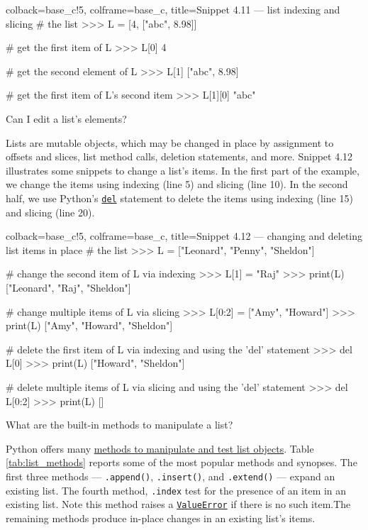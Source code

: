 \documentclass[a4paper,11pt]{book}
\newcommand{\question}[1]{%
    \begin{tcolorbox}[colback=comp_c!10,colframe=comp_c,sidebyside align=top,width=\linewidth,before skip=1ex]
        #1
    \end{tcolorbox}
    \switchcolumn%
}
\newcommand{\note}[1]{%
    \begin{tcolorbox}[colback=white!0,colframe=white!10,width=\linewidth,before skip=1ex]
        #1
    \end{tcolorbox}
}
\begin{document}
\begin{pythoncode}[linenos=true,]{colback=base_c!5, colframe=base_c, title=\sffamily Snippet 4.11 --- list indexing and slicing}
# the list
>>> L = [4, ["abc", 8.98]]

# get the first item of L
>>> L[0]
4

 # get the second element of L
>>> L[1]
["abc", 8.98]

# get the first item of L's second item
>>> L[1][0]
"abc"

\end{pythoncode}

\begin{paracol}{2}
	\question{\raggedright Can I edit a list's elements?}
	\note{Lists are mutable objects, which may be changed in place by assignment to offsets and slices, list method calls, deletion statements, and more. Snippet 4.12 illustrates some snippets to change a list's items. In the first part of the example, we change the items using indexing (line 5) and slicing (line 10). In the second half, we use Python's \href{https://docs.python.org/3/reference/simple_stmts.html}{\texttt{del}} statement to delete the items using indexing (line 15) and slicing (line 20).}
\end{paracol}

\begin{pythoncode}[linenos=true,]{colback=base_c!5, colframe=base_c, title=\sffamily Snippet 4.12 --- changing and deleting list items in place}
# the list
>>> L = ["Leonard", "Penny", "Sheldon"]

# change the second item of L via indexing
>>> L[1] = "Raj"
>>> print(L)
["Leonard", "Raj", "Sheldon"]

# change multiple items of L via slicing
>>> L[0:2] = ["Amy", "Howard"]
>>> print(L)
["Amy", "Howard", "Sheldon"]

# delete the first item of L via indexing and using the 'del' statement
>>> del L[0]
>>> print(L)
["Howard", "Sheldon"]

# delete multiple items of L via slicing and using the 'del' statement
>>> del L[0:2]
>>> print(L)
[]

\end{pythoncode}

\begin{paracol}{2}
\question{\raggedright What are the built-in methods to manipulate a list?}
\note{Python offers many \href{https://docs.python.org/3/tutorial/datastructures.html}{methods to manipulate and test list objects}. Table \ref{tab:list_methods} reports some of the most popular methods and synopses. The first three methods --- \texttt{.append()}, \texttt{.insert()}, and \texttt{.extend()} --- expand an existing list. The fourth method, \texttt{.index} test for the presence of an item in an existing list. Note this method raises a \href{https://docs.python.org/3/library/exceptions.html\#ValueError}{\texttt{ValueError}} if there is no such item.The remaining methods produce in-place changes in an existing list's items.}
\end{paracol}
\end{document}
